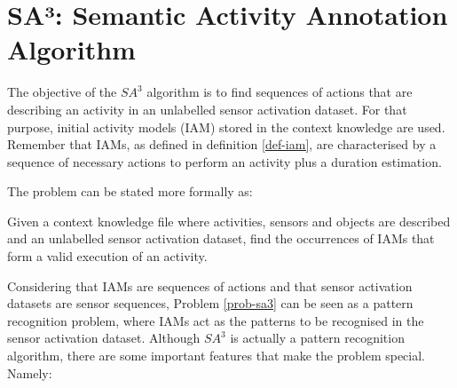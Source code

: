 \section{SA³: Semantic Activity Annotation Algorithm}
\label{sec:clustering:sa3}

The objective of the $SA^3$ algorithm is to find sequences of actions that are describing an activity in an unlabelled sensor activation dataset. For that purpose, initial activity models (IAM) stored in the context knowledge are used. Remember that IAMs, as defined in definition \ref{def-iam}, are characterised by a sequence of necessary actions to perform an activity plus a duration estimation. 

The problem can be stated more formally as:

\begin{problem}[$SA^3$]
\label{prob-sa3}
 Given a context knowledge file where activities, sensors and objects are described and an unlabelled sensor activation dataset, find the occurrences of IAMs that form a valid execution of an activity.
\end{problem}

Considering that IAMs are sequences of actions and that sensor activation datasets are sensor sequences, Problem \ref{prob-sa3} can be seen as a pattern recognition problem, where IAMs act as the patterns to be recognised in the sensor activation dataset. Although $SA^3$ is actually a pattern recognition algorithm, there are some important features that make the problem special. Namely:

